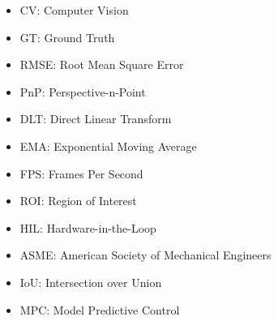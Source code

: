 \begin{itemize}
  \item CV: Computer Vision
  \item GT: Ground Truth
  \item RMSE: Root Mean Square Error
  \item PnP: Perspective-n-Point
  \item DLT: Direct Linear Transform
  \item EMA: Exponential Moving Average
  \item FPS: Frames Per Second
  \item ROI: Region of Interest
  \item HIL: Hardware-in-the-Loop
  \item ASME: American Society of Mechanical Engineers
  \item IoU: Intersection over Union
  \item MPC: Model Predictive Control
\end{itemize}
